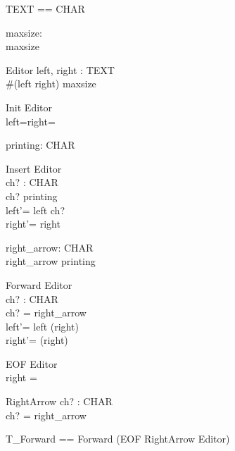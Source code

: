 \documentclass{llncs}
\begin{document}
\begin{zed}
[CHAR]
\end{zed}
\begin{zed}
TEXT == \seq CHAR
\end{zed}
\begin{axdef}
maxsize: \nat\\
\where maxsize 
\end{axdef}
\begin{schema}{Editor}
left, right : TEXT\\
\where \#(left \cat right) \leq maxsize
\end{schema}
\begin{schema}{Init}
Editor\\
\where left=right=\langle \rangle
\end{schema}
\begin{axdef}
printing: \power CHAR
\end{axdef}
\begin{schema}{Insert}
\Delta Editor \\
ch? : CHAR\\
\where ch? \in printing \\
left'= left \cat \langle ch? \rangle\\
right'= right
\end{schema}
\begin{axdef}
right\_arrow: CHAR \\
\where right\_arrow \notin printing
\end{axdef}
\begin{schema}{Forward}
\Delta Editor \\
ch? : CHAR \\
\where ch? = right\_arrow \\
left'= left \cat \langle \head (right) \rangle \\
right'= \tail (right)
\end{schema}
\begin{schema}{EOF}
Editor \\
\where right = \langle \rangle
\end{schema}
\begin{schema}{RightArrow}
ch? : CHAR \\
\where ch? = right\_arrow
\end{schema}
\begin{zed}
T\_Forward == Forward \lor (EOF \land RightArrow \land \Xi
Editor)
\end{zed}
\end{document}
